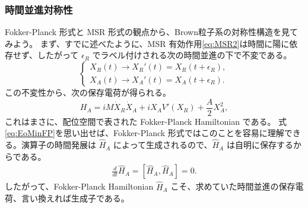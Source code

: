 \subsubsection{時間並進対称性}
\label{sec:TimeTrSym}
Fokker-Planck 形式と MSR 形式の観点から、Brown粒子系の対称性構造を見てみよう。
まず、すでに述べたように、MSR 有効作用\eqref{eq:MSR2}は時間に陽に依存せず、したがって $\epsilon_R$ でラベル付けされる次の時間並進の下で不変である。
\begin{equation}
 \begin{cases}
  X_R (t) \to X_R' (t) = X_R ( t + \epsilon_R ), \\ 
  X_A (t) \to X_A' (t) = X_A ( t + \epsilon_R ).
 \end{cases}
 \label{eq:Timetr1}
\end{equation}
この不変性から、次の保存電荷が得られる。
\begin{equation}
  H_A 
  = i M\dot{X}_R \dot{X}_A + i X_A V'(X_R) + \frac{A}{2} X_A^2 ,
\end{equation}
これはまさに、配位空間で表された Fokker-Planck Hamiltonian である。
式\eqref{eq:EoMinFP}を思い出せば、Fokker-Planck 形式ではこのことを容易に理解できる。演算子の時間発展は $\hat{H}_A$ によって生成されるので、$\hat{H}_A$ は自明に保存するからである。
\begin{align}
\frac{d }{dt}\hat H_{A}=[\hat H_{A},\hat H_{A}]=0.
\end{align}
したがって、Fokker-Planck Hamiltonian $\hat H_{A}$ こそ、求めていた時間並進の保存電荷、言い換えれば生成子である。

